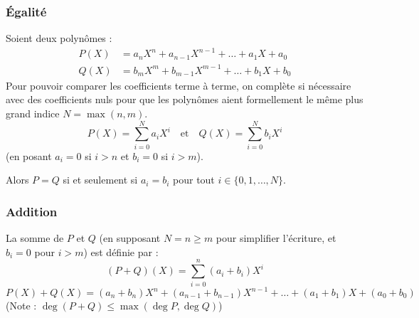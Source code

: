 \documentclass{article}
\begin{document}
\subsubsection*{Égalité}
Soient deux polynômes :
\begin{align*}
P(X) &= a_n X^n + a_{n-1} X^{n-1} + \dots + a_1 X + a_0 \\
Q(X) &= b_m X^m + b_{m-1} X^{m-1} + \dots + b_1 X + b_0
\end{align*}
Pour pouvoir comparer les coefficients terme à terme, on complète si nécessaire avec des coefficients nuls pour que les polynômes aient formellement le même plus grand indice $N = \max(n,m)$.
\[ P(X) = \sum_{i=0}^N a_i X^i \quad \text{et} \quad Q(X) = \sum_{i=0}^N b_i X^i \]
(en posant $a_i = 0$ si $i>n$ et $b_i = 0$ si $i>m$).

Alors $P = Q$ si et seulement si $a_i = b_i$ pour tout $i \in \{0, 1, \dots, N\}$.

\subsubsection*{Addition}
La somme de $P$ et $Q$ (en supposant $N = n \ge m$ pour simplifier l'écriture, et $b_i = 0$ pour $i>m$) est définie par :
\[ (P+Q)(X) = \sum_{i=0}^n (a_i + b_i) X^i \]
\[ P(X) + Q(X) = (a_n + b_n) X^n + (a_{n-1} + b_{n-1}) X^{n-1} + \dots + (a_1 + b_1) X + (a_0 + b_0) \]
(Note : $\deg(P+Q) \le \max(\deg P, \deg Q)$)
\end{document}
